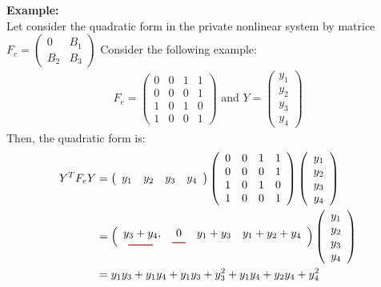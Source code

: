 \noindent
\textbf{Example:}\\
Let consider the quadratic form in the private nonlinear system by matrice $F_e = \left( \begin{array}{c|c}
        0 & B_1 \\
        \hline
        B_2 & B_3
    \end{array} \right)$
\noindent
Consider the following example:
\begin{align*}
    F_e = \left( \begin{array}{cccc}
        0 & 0 & 1 & 1 \\
        0 & 0 & 0 & 1 \\
        1 & 0 & 1 & 0 \\
        1 & 0 & 0 & 1
    \end{array} \right) \text{ and } Y = \left( \begin{array}{c}
        y_1 \\
        y_2 \\
        y_3 \\
        y_4
    \end{array} \right)
\end{align*}
\noindent
Then, the quadratic form is:
\begin{align*}
    Y^T F_e Y & = \left( \begin{array}{cccc}
        y_1 & y_2 & y_3 & y_4
    \end{array} \right) \left( \begin{array}{cccc}
        0 & 0 & 1 & 1 \\
        0 & 0 & 0 & 1 \\
        1 & 0 & 1 & 0 \\
        1 & 0 & 0 & 1
    \end{array} \right) \left( \begin{array}{c}
        y_1 \\
        y_2 \\
        y_3 \\
        y_4
    \end{array} \right) \\
    & = \left( \begin{array}{cccc}
        \underset{\color{red}\rule{2.2em}{0.8pt}}{y_3+y_4}, & \underset{\color{red}\rule{1.2em}{0.8pt}}{0} & y_1+y_3 & y_1+y_2+y_4
        \end{array} \right) \left( \begin{array}{c}
        y_1 \\
        y_2 \\
        y_3 \\
        y_4 \end{array} \right) \\
    & = y_1y_3+y_1y_4+y_1y_3+y_3^2+y_1y_4+y_2y_4+y_4^2 
\end{align*}

